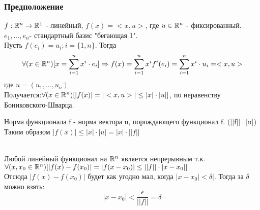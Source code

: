 \subsubsection{Предположение}
$f:\mathbb{R}^n\to\mathbb{R}^1$ - линейный, $f(x)=<x,u>$, где $u\in\mathbb{R}^n$ - фиксированный.
\\
$e_1,...,e_n$- стандартный базис "бегающая 1".
\\
Пусть $f(e_i)=u_i;i=\{1,n\}$. Тогда 
$$
\forall(x\in\mathbb{R}^n)[x=\sum_{i=1}^{n}x^i\cdot e_i]\Rightarrow f(x)=\sum_{i=1}^{n}x^i f^i(e_i)=\sum_{i=1}^{n} x^i\cdot u_i=<x,u>
$$
где $u=(u_1,...,u_n)$
\\
Получается:$\forall(x\in\mathbb{R}^n)[|f(x)|=|<x,u>|\le|x|\cdot |u|]$, по неравенству Бониковского-Шварца.
\\
\begin{opred}
	Норма функционала f - норма вектора u, порождающего функционал f. (||f||=|u|)
	\\
	Таким образом $|f(x)|\le|x|\cdot|u|=|x|\cdot||f||$
\end{opred}
\\
Любой линейный функционал на $\mathbb{R}^n$ является непрерывным т.к. $\forall(x,x_0 \in \mathbb{R}^n)[|f(x)-f(x_0)|=|f(x-x_0)|\le||f||\cdot |x-x_0|]$
\\
Отсюда $|f(x)-f(x_0)|$ будет как угодно мал, когда $|x-x_0|<\delta|$. Тогда за $\delta$ можно взять:
$$
|x-x_0|<\frac{\epsilon}{||f||}=\delta
$$







